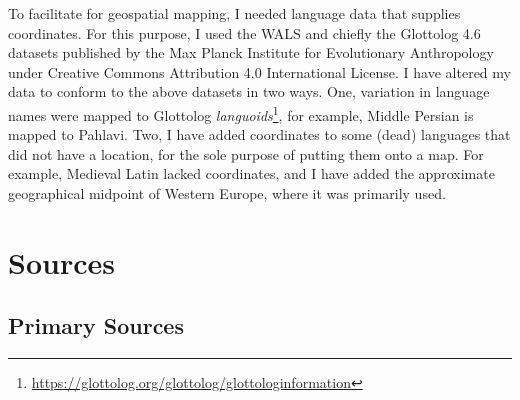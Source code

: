 To facilitate for geospatial mapping, I needed language data that supplies coordinates. For this purpose, I used the \gls{WALS} \autocite{dryer_wals_2013} and chiefly the Glottolog 4.6 \autocite{hammarstrom_glottolog_2022} datasets published by the Max Planck Institute for Evolutionary Anthropology under Creative Commons Attribution 4.0 International License. I have altered my data to conform to the above datasets in two ways. One, variation in language names were mapped to Glottolog \textit{languoids}\footnote{\url{https://glottolog.org/glottolog/glottologinformation}}, for example, Middle Persian is mapped to Pahlavi. Two, I have added coordinates to some (dead) languages that did not have a location, for the sole purpose of putting them onto a map. For example, Medieval Latin lacked coordinates, and I have added the approximate geographical midpoint of Western Europe, where it was primarily used.

\section{Sources}

\subsection{Primary Sources}


